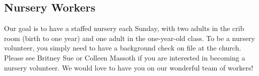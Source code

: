 \vspace{\fill}

\subsection{Nursery Workers}
\label{nurseryworkers}

Our goal is to have a staffed nursery each Sunday, with two adults in the crib room (birth to one year) and one adult in the one-year-old class.  To be a nursery volunteer, you simply need to have a background check on file at the church.  Please see Britney Sue or Colleen Massoth if you are interested in becoming a nursery volunteer.  We would love to have you on our wonderful team of workers!

\vspace{\fill}
